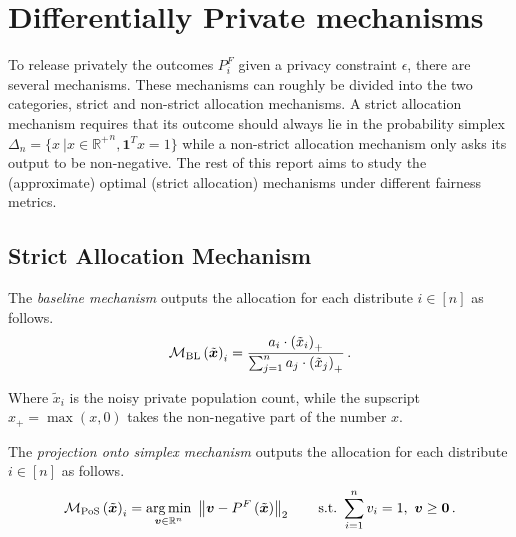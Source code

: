\section*{Differentially Private mechanisms}
To release privately the outcomes $P^F_i$ given a privacy constraint $\epsilon$, there are several mechanisms. These mechanisms can roughly be divided into the two categories, strict and non-strict allocation mechanisms. A strict allocation mechanism requires that
its outcome should always lie in the probability simplex $\Delta_n = \{x \  | x \in {\mathbb{R}^{+}}^{n}, \boldsymbol{1}^T x =1 \}$ while a non-strict allocation mechanism
only asks its output to be non-negative. The rest of this report aims to study the (approximate) optimal
(strict allocation) mechanisms under different fairness metrics.
\subsection*{Strict Allocation Mechanism}

\begin{definition}
	The \emph{baseline mechanism} outputs the allocation for each distribute $i\in [n]$ as follows.
	\begin{equation*}
		\mathcal{M}_{\mathrm{BL}}\left(\tilde{\bm{x}}\right)_i = \frac{a_i\cdot \left(\tilde{x}_i\right)_+}{\sum_{j=1}^n a_j\cdot \left(\tilde{x}_j\right)_+}\,.
	\end{equation*}
\end{definition}

Where $\tilde{x}_i$ is the noisy private population count, while the supscript $x_{+} = \max(x, 0)$ takes the non-negative part of the number $x$.


\begin{definition}
	The \emph{projection onto simplex mechanism} outputs the allocation for each distribute $i\in [n]$ as follows.
	\begin{equation*}
		\mathcal{M}_{\mathrm{PoS}}\left(\tilde{\bm{x}}\right)_i = \underset{\bm{v}\in\mathbb{R}^n}{\arg\min}~\left\lVert\bm{v}-P^F\left(\tilde{\bm{x}}\right)\right\rVert_2\qquad\mathrm{s.t.}~
		\sum_{i=1}^n v_i = 1,~\bm{v}\geq \bm{0}\,.
	\end{equation*}
\end{definition}


